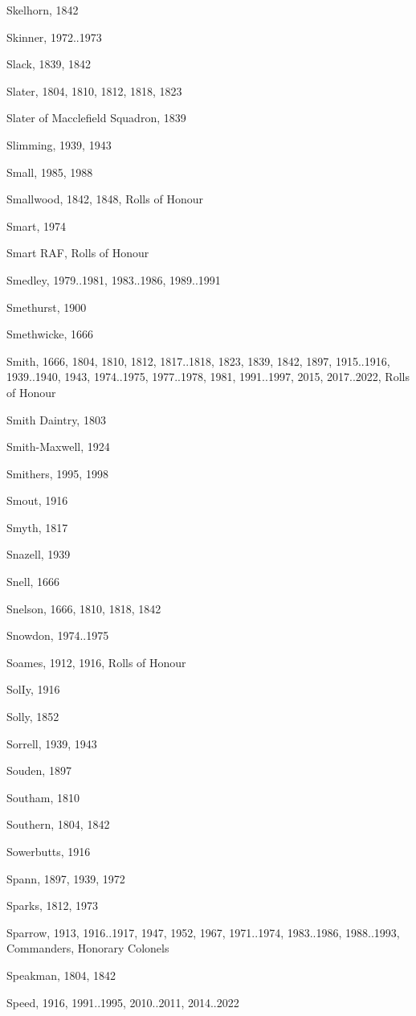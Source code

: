 \begin{theindex}
\item Skelhorn, 1842
\item Skinner, 1972..1973
\item Slack, 1839, 1842
\item Slater, 1804, 1810, 1812, 1818, 1823
\item Slater of Macclefield Squadron, 1839
\item Slimming, 1939, 1943
\item Small, 1985, 1988
\item Smallwood, 1842, 1848, Rolls of Honour
\item Smart, 1974
\item Smart RAF, Rolls of Honour
\item Smedley, 1979..1981, 1983..1986, 1989..1991
\item Smethurst, 1900
\item Smethwicke, 1666
\item Smith, 1666, 1804, 1810, 1812, 1817..1818, 1823, 1839, 1842, 1897, 1915..1916, 1939..1940, 1943, 1974..1975, 1977..1978, 1981, 1991..1997, 2015, 2017..2022, Rolls of Honour
\item Smith Daintry, 1803
\item Smith-Maxwell, 1924
\item Smithers, 1995, 1998
\item Smout, 1916
\item Smyth, 1817
\item Snazell, 1939
\item Snell, 1666
\item Snelson, 1666, 1810, 1818, 1842
\item Snowdon, 1974..1975
\item Soames, 1912, 1916, Rolls of Honour
\item SolIy, 1916
\item Solly, 1852
\item Sorrell, 1939, 1943
\item Souden, 1897
\item Southam, 1810
\item Southern, 1804, 1842
\item Sowerbutts, 1916
\item Spann, 1897, 1939, 1972
\item Sparks, 1812, 1973
\item Sparrow, 1913, 1916..1917, 1947, 1952, 1967, 1971..1974, 1983..1986, 1988..1993, Commanders, Honorary Colonels
\item Speakman, 1804, 1842
\item Speed, 1916, 1991..1995, 2010..2011, 2014..2022

\end{theindex}
